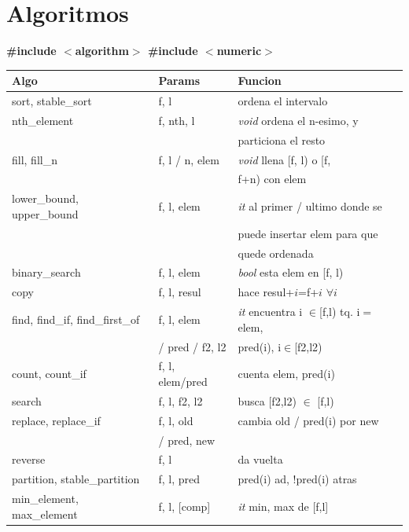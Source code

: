 \documentclass[10pt,landscape,twocolumn,a4paper,notitlepage]{article}
\begin{document}
\section{Algoritmos}
\textbf{\#include $<$algorithm$>$ \#include $<$numeric$>$ \\}
\begin{tabular}{|l|l|p{5.4cm}|} \hline
\textbf{Algo} & \textbf{Params} &  \textbf{Funcion} \\  \hline
sort, stable\_sort & f, l &  ordena el intervalo \\  \hline
nth\_element & f, nth, l & \textit{void} ordena el n-esimo, y \\ && particiona el resto \\  \hline
fill, fill\_n & f, l / n, elem & \textit{void} llena [f, l) o [f, \\ && f+n) con elem \\  \hline
lower\_bound, upper\_bound & f, l, elem & \textit{it} al primer / ultimo donde se \\ && puede insertar elem para que\\ && quede ordenada \\  \hline
binary\_search & f, l, elem & \textit{bool} esta elem en [f, l) \\  \hline
copy & f, l, resul & hace resul+$i$=f+$i$ $\forall i$ \\  \hline
find, find\_if, find\_first\_of & f, l, elem & \textit{it} encuentra i $\in$[f,l) tq. i$=$elem, \\ & / pred / f2, l2 & pred(i), i$\in$[f2,l2)\\\hline
count, count\_if & f, l, elem/pred & cuenta elem, pred(i)\\\hline
search & f, l, f2, l2 & busca [f2,l2) $\in$ [f,l)\\\hline
replace, replace\_if & f, l, old & cambia old / pred(i) por new \\ & / pred, new &\\\hline
reverse & f, l & da vuelta\\\hline
partition, stable\_partition & f, l, pred & pred(i) ad, !pred(i) atras\\\hline
min\_element, max\_element & f, l, [comp] & \textit{it} min, max de [f,l]\\\hline

\end{tabular}
\end{document}
